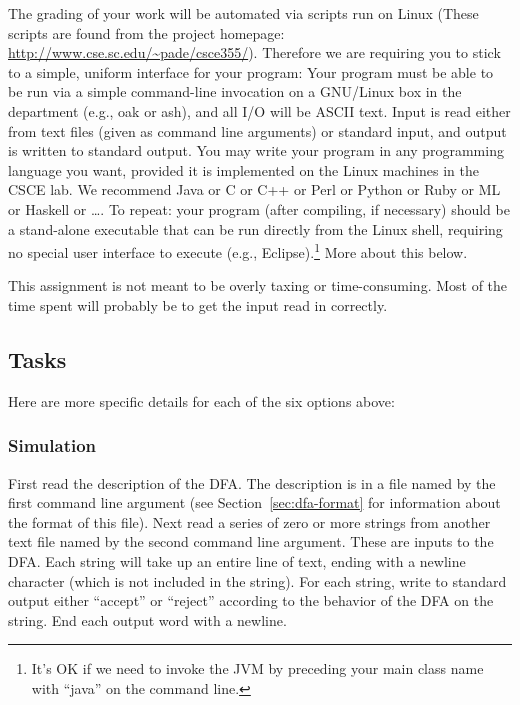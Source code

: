 \documentclass[11pt]{article}
\begin{document}
The grading of your work will be automated via scripts run on Linux
(These scripts are found from the project homepage:
\url{http://www.cse.sc.edu/~pade/csce355/}).  Therefore we are
requiring you to stick to a simple, uniform interface for your
program:  Your program must be able to be run via a simple
command-line invocation on a GNU/Linux box in the department (e.g.,
oak or ash), and all I/O will be ASCII text.  Input is read either
from text files (given as command line arguments) or standard input,
and output is written to standard output.  You may write your program
in any programming language you want, provided it is implemented on
the Linux machines in the CSCE lab.  We recommend Java or C or C++ or
Perl or Python or Ruby or ML or Haskell or \ldots.  To repeat: your
program (after compiling, if necessary) should be a stand-alone
executable that can be run directly from the Linux shell, requiring no
special user interface to execute (e.g., Eclipse).\footnote{It's OK if
  we need to invoke the JVM by preceding your main class name with
``java'' on the command line.}  More about this below.

This assignment is not meant to be overly taxing or time-consuming.
Most of the time spent will probably be to get the input read in
correctly.

\subsection{Tasks}

Here are more specific details for each of the six options above:

\subsubsection{Simulation}
First read the description of the DFA\@.  The description is in a file
named by the first command line argument (see
Section~\ref{sec:dfa-format} for information about the format of this
file).  Next read a series of zero or more strings from another text
file named by the second command line argument.  These are inputs to
the DFA\@.  Each string will take up an entire line of text, ending
with a newline character (which is not included in the string).  For
each string, write to standard output either ``accept'' or ``reject''
according to the behavior of the DFA on the string.  End each output
word with a newline.
\end{document}
